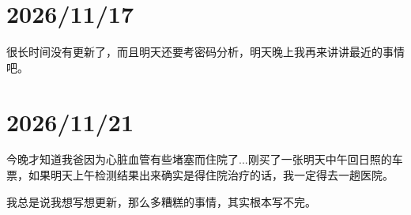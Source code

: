 
\section*{2026/11/17}
很长时间没有更新了，而且明天还要考密码分析，明天晚上我再来讲讲最近的事情吧。

\section*{2026/11/21}
今晚才知道我爸因为心脏血管有些堵塞而住院了...刚买了一张明天中午回日照的车票，如果明天上午检测结果出来确实是得住院治疗的话，我一定得去一趟医院。

我总是说我想写想更新，那么多糟糕的事情，其实根本写不完。
